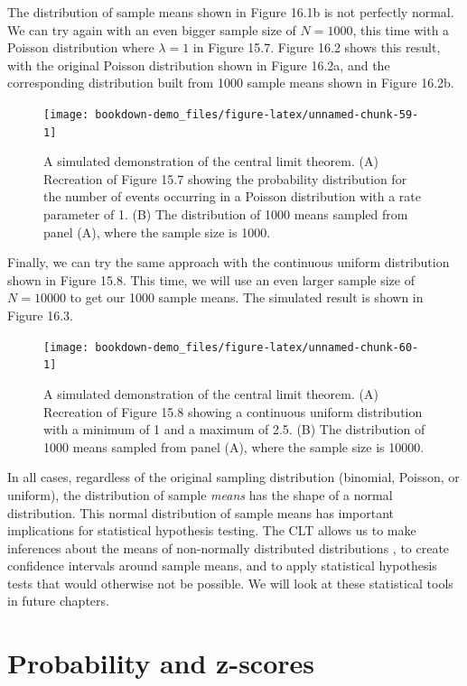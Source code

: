 \documentclass[
  openany]{krantz}
\begin{document}
The distribution of sample means shown in Figure 16.1b is not perfectly normal.
We can try again with an even bigger sample size of \(N = 1000\), this time with a Poisson distribution where \(\lambda = 1\) in Figure 15.7.
Figure 16.2 shows this result, with the original Poisson distribution shown in Figure 16.2a, and the corresponding distribution built from 1000 sample means shown in Figure 16.2b.

\begin{figure}
\texttt{[image: bookdown-demo\_files/figure-latex/unnamed-chunk-59-1]} \caption{A simulated demonstration of the central limit theorem. (A) Recreation of Figure 15.7 showing the probability distribution for the number of events occurring in a Poisson distribution with a rate parameter of 1. (B) The distribution of 1000 means sampled from panel (A), where the sample size is 1000.}\label{fig:unnamed-chunk-59}
\end{figure}

Finally, we can try the same approach with the continuous uniform distribution shown in Figure 15.8.
This time, we will use an even larger sample size of \(N = 10000\) to get our 1000 sample means.
The simulated result is shown in Figure 16.3.

\begin{figure}
\texttt{[image: bookdown-demo\_files/figure-latex/unnamed-chunk-60-1]} \caption{A simulated demonstration of the central limit theorem. (A) Recreation of Figure 15.8 showing a continuous uniform distribution with a minimum of 1 and a maximum of 2.5. (B) The distribution of 1000 means sampled from panel (A), where the sample size is 10000.}\label{fig:unnamed-chunk-60}
\end{figure}

In all cases, regardless of the original sampling distribution (binomial, Poisson, or uniform), the distribution of sample \emph{means} has the shape of a normal distribution.
This normal distribution of sample means has important implications for statistical hypothesis testing.
The CLT allows us to make inferences about the means of non-normally distributed distributions \citep{Sokal1995}, to create confidence intervals around sample means, and to apply statistical hypothesis tests that would otherwise not be possible.
We will look at these statistical tools in future chapters.

\hypertarget{probability-and-z-scores}{%
\section{Probability and z-scores}\label{probability-and-z-scores}}
\end{document}

